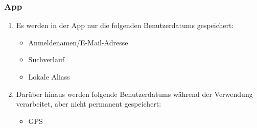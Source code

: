 \subsubsection*{App}

\begin{samepage}
    \begin{enumerate}[label=\textbf{/NFD\arabic*0/}, align=left]
        \item Es werden in der App nur die folgenden \Glspl{Benutzerdatum} gespeichert:
            \begin{itemize}
                \item Anmeldenamen/E-Mail-Adresse
                \item Suchverlauf
                \item Lokale \Glspl{Alias}
            \end{itemize}
            
        \item Darüber hinaus werden folgende \Glspl{Benutzerdatum} während der Verwendung verarbeitet, aber nicht permanent gespeichert:
            \begin{itemize}
                \item \Gls{GPS}
            \end{itemize}
    \end{enumerate}
\end{samepage}